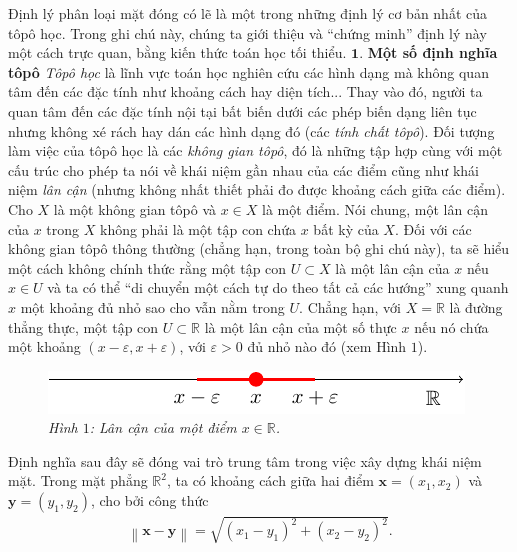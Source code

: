 \begin{multicols}{2}	
	Định lý phân loại mặt đóng có lẽ là một trong những định lý cơ bản nhất của tôpô học. Trong ghi chú này, chúng ta giới thiệu và ``chứng minh'' định lý này một cách trực quan, bằng kiến thức toán học tối thiểu.
	\vskip 0.1cm
	$\pmb{1.}$ \textbf{\color{duongvaotoanhoc}Một số định nghĩa tôpô}
	\vskip 0.1cm
	{\it Tôpô học} là lĩnh vực toán học nghiên cứu các hình dạng mà không quan tâm đến các đặc tính như khoảng cách hay diện tích... Thay vào đó, người ta quan tâm đến các đặc tính nội tại bất biến dưới các phép biến dạng liên tục nhưng không xé rách hay dán các hình dạng đó (các {\it tính chất tôpô}). Đối tượng làm việc của tôpô học là các {\it không gian tôpô}, đó là những tập hợp cùng với một cấu trúc cho phép ta nói về khái niệm gần nhau của các điểm cũng như khái niệm {\it lân cận} (nhưng không nhất thiết phải đo được khoảng cách giữa các điểm).
	\vskip 0.1cm
	Cho $X$ là một không gian tôpô và $x \in X$ là một điểm. Nói chung, một lân cận của $x$ trong $X$ không phải là một tập con chứa $x$ bất kỳ của $X$. Đối với các không gian tôpô thông thường (chẳng hạn, trong toàn bộ ghi chú này), ta sẽ hiểu một cách không chính thức rằng một tập con $U \subset X$ là một lân cận của $x$ nếu $x \in U$ và ta có thể ``di chuyển một cách tự do theo tất cả các hướng'' xung quanh $x$ một khoảng đủ nhỏ sao cho vẫn nằm trong $U$. Chẳng hạn, với $X = \mathbb{R}$ là đường thẳng thực, một tập con $U \subset \mathbb{R}$ là một lân cận của một số thực $x$ nếu nó chứa một khoảng $(x - \varepsilon, x + \varepsilon)$, với $\varepsilon > 0$ đủ nhỏ nào đó (xem Hình $1$).
	\begin{figure}[H]
		\vspace*{-5pt}
		\centering\captionsetup{labelformat=empty, justification=centering}
		\includegraphics[width=1\linewidth]{H1.pdf}
		\caption{\small\textit{\color{duongvaotoanhoc}Hình $1$: Lân cận của một điểm $x \in \mathbb{R}$.}}
		\vspace*{-10pt}
	\end{figure}
	Định nghĩa sau đây sẽ đóng vai trò trung tâm trong việc xây dựng khái niệm mặt. Trong mặt phẳng $\mathbb{R}^2$, ta có khoảng cách giữa hai điểm $\mathbf{x} = (x_1,x_2)$ và $\mathbf{y} = (y_1,y_2)$, cho bởi công thức
	\begin{align*}
		\left\|\mathbf{x} - \mathbf{y}\right\| = \sqrt{(x_1 - y_1)^2 + (x_2 - y_2)^2}.

\end{align*}
\end{multicols}
